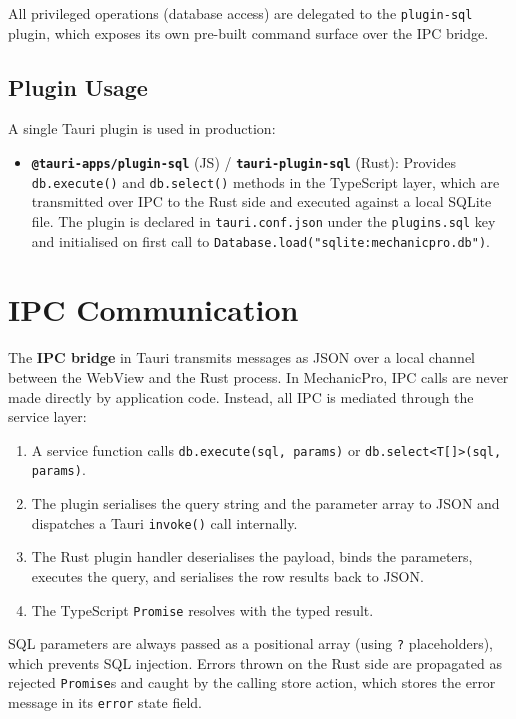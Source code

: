 \documentclass[12pt, a4paper]{report}
\newcommand{\term}[1]{\textbf{\color{Blue}#1}}
\begin{document}
	All privileged operations (database access) are delegated to the
	\texttt{plugin-sql} plugin, which exposes its own pre-built command surface
	over the IPC bridge.

	\subsection{Plugin Usage}
	A single Tauri plugin is used in production:

	\begin{itemize}
		\item \textbf{\texttt{@tauri-apps/plugin-sql}} (JS) /
		      \textbf{\texttt{tauri-plugin-sql}} (Rust): Provides \texttt{db.execute()}
		      and \texttt{db.select()} methods in the TypeScript layer, which are
		      transmitted over IPC to the Rust side and executed against a local
		      SQLite file. The plugin is declared in \texttt{tauri.conf.json} under
		      the \texttt{plugins.sql} key and initialised on first call to
		      \texttt{Database.load("sqlite:mechanicpro.db")}.
	\end{itemize}

	\section{IPC Communication}
	\label{sec:ipc}
	The \term{IPC bridge} in Tauri transmits messages as JSON over a local
	channel between the WebView and the Rust process. In MechanicPro, IPC
	calls are never made directly by application code. Instead, all IPC
	is mediated through the service layer:

	\begin{enumerate}
		\item A service function calls \texttt{db.execute(sql, params)} or
		      \texttt{db.select<T[]>(sql, params)}.
		\item The plugin serialises the query string and the parameter array
		      to JSON and dispatches a Tauri \texttt{invoke()} call internally.
		\item The Rust plugin handler deserialises the payload, binds the
		      parameters, executes the query, and serialises the row results back
		      to JSON.
		\item The TypeScript \texttt{Promise} resolves with the typed result.
	\end{enumerate}

	SQL parameters are always passed as a positional array (using \texttt{?}
	placeholders), which prevents SQL injection. Errors thrown on the Rust side
	are propagated as rejected \texttt{Promise}s and caught by the calling store
	action, which stores the error message in its \texttt{error} state field.
\end{document}
